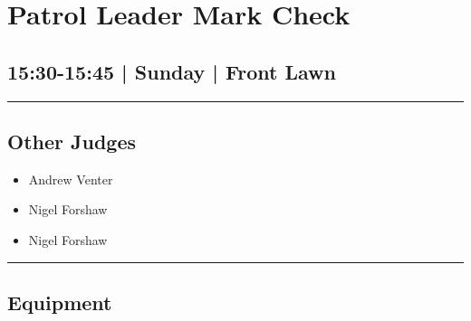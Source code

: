 \documentclass[10pt, A5]{article}
\begin{document}
        \begin{framed}
        \begin{minipage}{\textwidth}

        \setcounter{section}{89}
        \section{Patrol Leader Mark Check}
        \subsection*{15:30-15:45 | Sunday | Front Lawn}

        \vspace{0.25cm}
        \hrule
        \vspace{0.25cm}


        \subsection*{Other Judges}
                    

        	\begin{multicols}{2}

		\begin{itemize}
									\item Andrew Venter
									\item Nigel Forshaw
						\end{itemize}

		\vfill\null
		\columnbreak

		\begin{itemize}
									\item Nigel Forshaw
						\end{itemize}

		\vfill\null

		\end{multicols}

    \vspace{0.25cm}
        \hrule
        \vspace{0.25cm}

        \begin{multicols}{2}

		\section*{\faWrench \: Equipment}

		
	\begin{center}
			\begin{tabular}{p{2cm}p{4cm}}



\end{tabular}
\end{center}
\end{multicols}
\end{minipage}
\end{framed}
\end{document}
